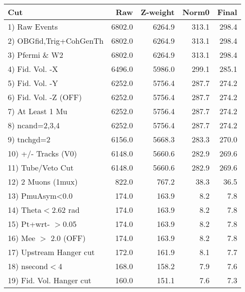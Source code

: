  \begin{table}[h!]\centering
 \begin{tabular}{||l||r|r|r|r||}
 \hline
 \hline
 Cut & Raw & Z-weight & Norm0 & Final \\
 \hline
  1) Raw Events           &      6802.0 &      6264.9 &       313.1 &       298.4 \\
  2) OBGfid,Trig+CohGenTh &      6802.0 &      6264.9 &       313.1 &       298.4 \\
  3) Pfermi \& W2         &      6802.0 &      6264.9 &       313.1 &       298.4 \\
  4) Fid. Vol. -X         &      6496.0 &      5986.0 &       299.1 &       285.1 \\
  5) Fid. Vol. -Y         &      6252.0 &      5756.4 &       287.7 &       274.2 \\
  6) Fid. Vol. -Z (OFF)   &      6252.0 &      5756.4 &       287.7 &       274.2 \\
  7) At Least 1 Mu        &      6252.0 &      5756.4 &       287.7 &       274.2 \\
  8) ncand=2,3,4          &      6252.0 &      5756.4 &       287.7 &       274.2 \\
  9) tnchgd=2             &      6156.0 &      5668.3 &       283.3 &       270.0 \\
 10) +/- Tracks (V0)      &      6148.0 &      5660.6 &       282.9 &       269.6 \\
 11) Tube/Veto Cut        &      6148.0 &      5660.6 &       282.9 &       269.6 \\
 12) 2 Muons (1mux)       &       822.0 &       767.2 &        38.3 &        36.5 \\
 13) PmuAsym<0.0          &       174.0 &       163.9 &         8.2 &         7.8 \\
 14) Theta$<$2.62 rad     &       174.0 &       163.9 &         8.2 &         7.8 \\
 15) Pt+wrt- $>$0.05      &       174.0 &       163.9 &         8.2 &         7.8 \\
 16) Mee $>$ 2.0  (OFF)   &       174.0 &       163.9 &         8.2 &         7.8 \\
 17) Upstream Hanger cut  &       172.0 &       161.9 &         8.1 &         7.7 \\
 18) nsecond$<$4          &       168.0 &       158.2 &         7.9 &         7.6 \\
 19) Fid. Vol. Hanger cut &       160.0 &       151.1 &         7.6 &         7.3 \\

\end{tabular}
\end{table}

